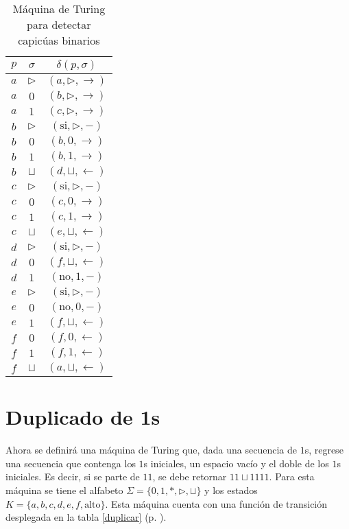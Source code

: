\documentclass[paper=leter, fontsize=11pt]{scrartcl}
\numberwithin{equation}{section}		%
\numberwithin{figure}{section}			%
\numberwithin{table}{section}				%
\begin{document}
\begin{table}[]
	\caption{Máquina de Turing para detectar capicúas binarios}
	\label{capicua}
	\centering
	\begin{tabular}{cc|c}
	$p$ & $\sigma$ & $\delta(p, \sigma)$ \\ \hline
	$a$ & $\triangleright$ & $(a, \triangleright, \rightarrow)$ \\
	$a$ & $0$ & $(b, \triangleright, \rightarrow)$ \\
	$a$ & $1$ & $(c, \triangleright, \rightarrow)$ \\
	$b$ & $\triangleright$ & $(\text{si}, \triangleright, -)$ \\
	$b$ & $0$ & $(b, 0, \rightarrow)$ \\
	$b$ & $1$ & $(b, 1, \rightarrow)$ \\
	$b$ & $\sqcup$ & $(d, \sqcup, \leftarrow)$ \\
	$c$ & $\triangleright$ & $(\text{si}, \triangleright, -)$ \\
	$c$ & $0$ & $(c, 0, \rightarrow)$ \\
	$c$ & $1$ & $(c, 1, \rightarrow)$ \\
	$c$ & $\sqcup$ & $(e, \sqcup, \leftarrow)$ \\
	$d$ & $\triangleright$ & $(\text{si}, \triangleright, -)$ \\
	$d$ & $0$ & $(f, \sqcup, \leftarrow)$ \\
	$d$ & $1$ & $(\text{no}, 1, -)$ \\
	$e$ & $\triangleright$ & $(\text{si}, \triangleright, -)$ \\
	$e$ & $0$ & $(\text{no}, 0, -)$ \\
	$e$ & $1$ & $(f, \sqcup, \leftarrow)$ \\
	$f$ & $0$ & $(f, 0, \leftarrow)$ \\
	$f$ & $1$ & $(f, 1, \leftarrow)$ \\
	$f$ & $\sqcup$ & $(a, \sqcup, \leftarrow)$
	\end{tabular}
\end{table}


\section{Duplicado de 1s}

Ahora se definirá una máquina de Turing que, dada una secuencia de $1$s, regrese una secuencia que contenga los $1$s iniciales, un espacio vacío y el doble de los $1$s iniciales. Es decir, si se parte de $11$, se debe retornar $11 \sqcup 1111$. Para esta máquina se tiene el alfabeto $\Sigma = \{ 0, 1, *, \triangleright, \sqcup \}$ y los estados $K = \{ a, b, c, d, e, f, \text{alto} \}$. Esta máquina cuenta con una función de transición desplegada en la tabla \ref{duplicar} (p. \pageref{duplicar}).
\end{document}
